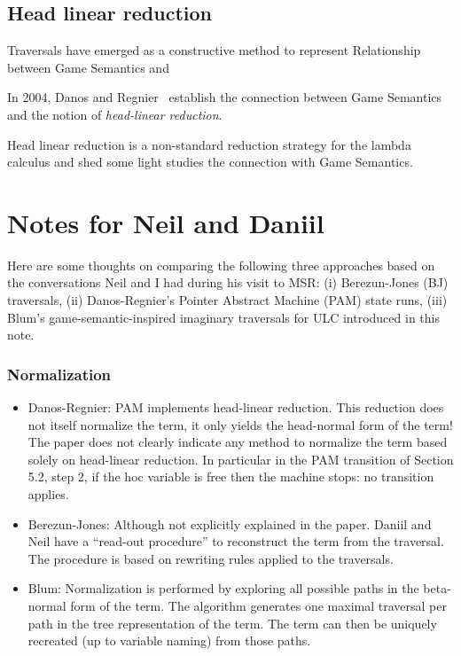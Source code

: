 \documentclass{article}
\theoremstyle{definition}
\begin{document}
\subsection{Head linear reduction}

Traversals have emerged as a constructive method to represent
Relationship between Game Semantics and

In 2004, Danos and Regnier~\cite{danos-head} establish the connection between Game Semantics and the notion of \emph{head-linear reduction}.

Head linear reduction is  a non-standard reduction strategy for the lambda calculus and shed some light studies the connection with Game Semantics.



\appendix

\section{Notes for Neil and Daniil}

Here are some thoughts on comparing the following three approaches
based on the conversations Neil and I had during his visit to MSR:
(i) Berezun-Jones (BJ) traversals,
(ii) Danos-Regnier's Pointer Abstract Machine (PAM) state runs,
(iii) Blum's game-semantic-inspired imaginary traversals for ULC introduced in this note.

\subsubsection{Normalization}

\begin{itemize}
  \item Danos-Regnier: PAM implements head-linear reduction. This reduction does not itself normalize the term, it only yields the head-normal form of the term! The paper does not clearly indicate any method to normalize the term based solely on head-linear reduction.
      In particular in the PAM transition of Section 5.2, step 2, if the hoc variable is free then the machine stops: no transition applies.
  \item Berezun-Jones: Although not explicitly explained in the paper. Daniil and Neil have a ``read-out procedure'' to reconstruct the term from the traversal. The procedure is based on rewriting rules applied to the traversals.
  \item Blum: Normalization is performed by exploring all possible paths in the beta-normal form of the term. The algorithm generates one maximal traversal per path in the tree representation of the term. The term can then be uniquely recreated (up to variable naming) from those paths.
\end{itemize}
\end{document}
